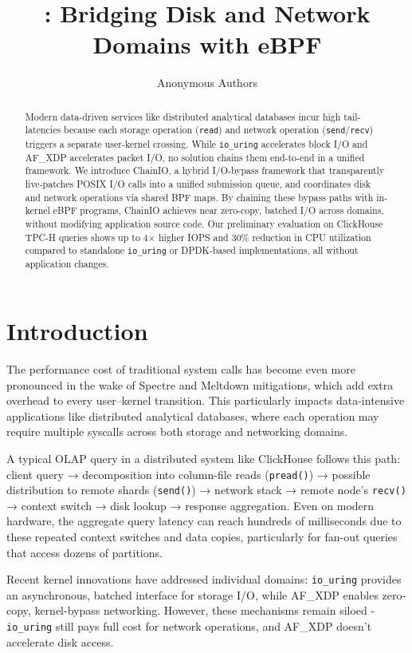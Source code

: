 \documentclass[sigconf,10pt]{acmart}
\title{\sys: Bridging Disk and Network Domains with eBPF}
\author{
Anonymous Authors
}
\newcommand{\sys}{ChainIO\xspace}
\begin{document}
\begin{abstract}
Modern data-driven services like distributed analytical databases incur high tail-latencies because each storage operation (\texttt{read}) and network operation (\texttt{send}/\texttt{recv}) triggers a separate user-kernel crossing. While \texttt{io\_uring} accelerates block I/O and AF\_XDP accelerates packet I/O, no solution chains them end-to-end in a unified framework. We introduce \sys, a hybrid I/O-bypass framework that transparently live-patches POSIX I/O calls into a unified submission queue, and coordinates disk and network operations via shared BPF maps. By chaining these bypass paths with in-kernel eBPF programs, \sys achieves near zero-copy, batched I/O across domains, without modifying application source code. Our preliminary evaluation on ClickHouse TPC-H queries shows up to 4× higher IOPS and 30\% reduction in CPU utilization compared to standalone \texttt{io\_uring} or DPDK-based implementations, all without application changes.
\end{abstract}

\maketitle

\section{Introduction}

The performance cost of traditional system calls has become even more pronounced in the wake of Spectre and Meltdown mitigations, which add extra overhead to every user–kernel transition. This particularly impacts data-intensive applications like distributed analytical databases, where each operation may require multiple syscalls across both storage and networking domains.

A typical OLAP query in a distributed system like ClickHouse follows this path: client query → decomposition into column-file reads (\texttt{pread()}) → possible distribution to remote shards (\texttt{send()}) → network stack → remote node's \texttt{recv()} → context switch → disk lookup → response aggregation. Even on modern hardware, the aggregate query latency can reach hundreds of milliseconds due to these repeated context switches and data copies, particularly for fan-out queries that access dozens of partitions.

Recent kernel innovations have addressed individual domains: \texttt{io\_uring} provides an asynchronous, batched interface for storage I/O, while AF\_XDP enables zero-copy, kernel-bypass networking. However, these mechanisms remain siloed - \texttt{io\_uring} still pays full cost for network operations, and AF\_XDP doesn't accelerate disk access.
\end{document}
